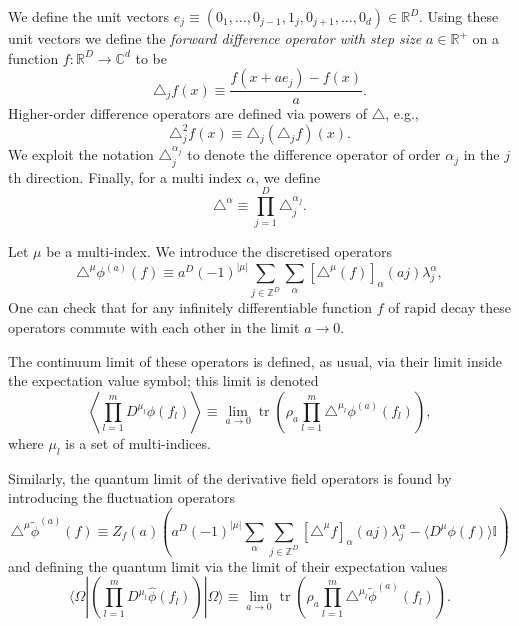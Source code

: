 \documentclass[prl,twocolumn,lengthcheck,superscriptaddress]{revtex4-1}
\newcommand{\tr}{\operatorname{tr}}
\theoremstyle{definition}
\theoremstyle{remark}
\begin{document}
We define the unit vectors $e_j \equiv (0_1, \ldots, 0_{j-1}, 1_j, 0_{j+1}, \ldots, 0_d) \in \mathbb{R}^D$. Using these unit vectors we define the \emph{forward difference operator with step size} $a\in \mathbb{R}^+$ on a function $f:\mathbb{R}^D\rightarrow \mathbb{C}^d$ to be
\begin{equation}
	\triangle_jf(x) \equiv \frac{f(x+ae_j)-f(x)}{a}.
\end{equation}
Higher-order difference operators are defined via powers of $\triangle$, e.g.,
\begin{equation}
	\triangle_j^2f(x) \equiv \triangle_j(\triangle_jf)(x).
\end{equation}
We exploit the notation $\triangle_j^{\alpha_j}$ to denote the difference operator of order $\alpha_j$ in the $j$th direction. Finally, for a multi index $\alpha$, we define
\begin{equation}
	\triangle^\alpha \equiv \prod_{j=1}^D \triangle_j^{\alpha_j}.
\end{equation}

Let $\mu$ be a multi-index. We introduce the discretised operators  
\begin{equation}
	\triangle^{\mu}\phi^{(a)}(f) \equiv a^D(-1)^{|\mu|}\sum_{j\in\mathbb{Z}^D} \sum_{\alpha} [\triangle^\mu(f)]_\alpha(aj) \lambda_j^\alpha,
\end{equation}
One can check that for any infinitely differentiable function $f$ of rapid decay these operators commute with each other in the limit $a\rightarrow0$. 

The continuum limit of these operators is defined, as usual, via their limit inside the expectation value symbol; this limit is denoted
\begin{equation}
	\left\langle\prod_{l=1}^m D^{\mu_l}\phi(f_l)\right\rangle \equiv \lim_{a\rightarrow 0} \tr\left(\rho_a \prod_{l=1}^m\triangle^{\mu_l}\phi^{(a)}(f_l)\right),
\end{equation}
where $\mu_l$ is a set of multi-indices.

Similarly, the quantum limit of the derivative field operators is found by introducing the fluctuation operators 
\begin{equation}
	\triangle^\mu\widetilde{\phi}^{(a)}(f) \equiv Z_f(a)\left( a^D(-1)^{|\mu|}\sum_{\alpha}\sum_{j\in \mathbb{Z}^D} [\triangle^\mu f]_\alpha(aj) \lambda^\alpha_j - \langle D^\mu\phi(f)\rangle\mathbb{I}\right)
\end{equation}
and defining the quantum limit via the limit of their expectation values 
\begin{equation}\label{eq:qctslimit}
	\langle\Omega|\left(\prod_{l=1}^m D^{\mu_l}\widehat{\phi}(f_l)\right)|\Omega\rangle \equiv \lim_{a\rightarrow 0} \tr\left(\rho_a \prod_{l=1}^m\triangle^{\mu_l}\widetilde{\phi}^{(a)}(f_l)\right).
\end{equation}
\end{document}
